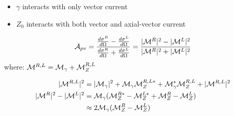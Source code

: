 \begin{itemize}
    \item $\gamma$ interacts with only vector current
    \item $Z_0$ interacts with both vector and axial-vector current
\end{itemize}

\begin{equation*}
    \mathcal{A}_{pv} = \frac{\frac{d\sigma^R}{d\Omega} - \frac{d\sigma^L}{d\Omega}}{\frac{d\sigma^R}{d\Omega} + \frac{d\sigma^L}{d\Omega}} = \frac{|\mathcal{M}^R|^2 - |\mathcal{M}^L|^2}{|\mathcal{M}^R|^2 + |\mathcal{M}^L|^2}
\end{equation*}
where: $\mathcal{M}^{R, L} = \mathcal{M}_{\gamma} + \mathcal{M}_Z^{R,L}$

\begin{equation*}
    \begin{aligned}
	|\mathcal{M}^{R,L}|^2 &= |\mathcal{M}_\gamma|^2 + \mathcal{M}_\gamma\mathcal{M}_Z^{R,L*} + \mathcal{M}_\gamma^*\mathcal{M}_Z^{R,L} + |\mathcal{M}^{R,L}|^2	\\
	|\mathcal{M}^{R}|^2 - |\mathcal{M}^{L}|^2 &= \mathcal{M}_\gamma( \mathcal{M}_Z^{R*} - \mathcal{M}_Z^{L*} + \mathcal{M}_Z^{R} - \mathcal{M}_Z^L) \\
	&\approx 2\mathcal{M}_\gamma(\mathcal{M}_Z^R - \mathcal{M}_Z^L)
    \end{aligned}
\end{equation*}


